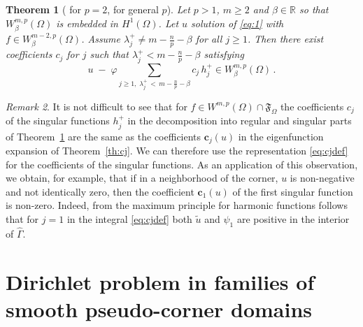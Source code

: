 \documentclass[titlepage,12pt]{amsart}
\newtheorem{theorem}{Theorem}[section]
\theoremstyle{definition}
\theoremstyle{remark}
\newtheorem{remark}[theorem]{Remark}
\numberwithin{equation}{section}
\newcommand\R{{\mathbb R}}
\newcommand {\gF}{\mathfrak{F}}
\begin{document}
\begin{theorem}[\cite{Kond:1967} for $p=2$, \cite{MazPla:1978} for general $p$]
\label{T:regsing}
Let $p>1$, $m\ge2$ and $\beta\in\R$ so that $W^{m,p}_\beta(\Omega)$ is embedded in $H^{1}(\Omega)$.
Let $u$ solution of \eqref{eq:1} with $f\in W^{m-2,p}_\beta(\Omega)$.
Assume  $\lambda^+_j \neq m-\frac{n}{p}-\beta$ for all $j\ge 1$.
Then there exist coefficients $c_j$ for $j$ such that $\lambda^+_j < m-\frac{n}{p}-\beta$ satisfying
\[
   u \; - \;\varphi\!\!\sum_{j\ge1,\; \lambda^+_j \,<\, m-\frac{n}{p}-\beta} 
   c_j\,h^+_j \in W^{m,p}_\beta(\Omega)\,.
\]
\end{theorem}


\begin{remark}
\label{R:pos}
It is not difficult to see that 
for $f\in W^{m,p}(\Omega)\cap\gF_\Omega$
the coefficients $c_{j}$ of the singular functions $h^{+}_{j}$ in the decomposition into regular and singular parts of Theorem~\ref{T:regsing} are the same as the coefficients $\mathbf{c}_j(u)$ in the eigenfunction expansion of Theorem~\ref{th:cj}. We can therefore use the representation \eqref{eq:cjdef} for the coefficients of the singular functions. As an application of this observation, we obtain, for example, that if in a neighborhood of the corner, $u$ is non-negative and not identically zero, then the coefficient $\mathbf{c}_{1}(u)$ of the first singular function is non-zero. Indeed, from the maximum principle for harmonic functions follows that for $j=1$ in the integral \eqref{eq:cjdef} both $\widetilde u $ and $\psi_1$ are positive in the interior of $\widehat\Gamma$.
\end{remark}



\section{Dirichlet problem in families of smooth pseudo-corner domains}
\end{document}
